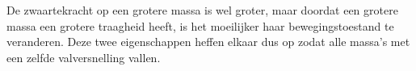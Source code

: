 De zwaartekracht op een grotere massa is wel groter, maar doordat
een grotere massa een grotere traagheid heeft, is het moeilijker haar
bewegingstoestand te veranderen. Deze twee eigenschappen heffen
elkaar dus op zodat alle massa's met een zelfde valversnelling vallen.




